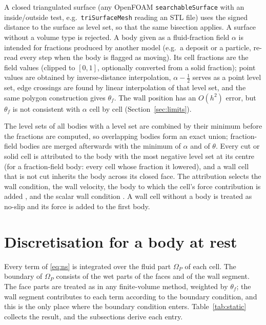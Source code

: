 \documentclass[11pt,a4paper]{article}
\theoremstyle{remark}
\newcommand{\code}[1]{\texttt{#1}}
\begin{document}
A closed triangulated surface (any OpenFOAM \code{searchableSurface} with an inside/outside
test, e.g.\ \code{triSurfaceMesh} reading an STL file) uses the signed distance to the surface
as level set, so that the same bisection applies. A surface without a volume type is
rejected.
A body given as a fluid-fraction field $\alpha$ is intended for fractions produced by
another model (e.g.\ a deposit or a particle, re-read every step when the body is flagged as
moving).
Its cell fractions are the field values (clipped to $[0,1]$, optionally converted from a
solid fraction); point values are obtained by inverse-distance interpolation, $\alpha-\tfrac12$
serves as a point level set, edge crossings are found by linear interpolation of that level
set, and the same polygon construction gives $\theta_f$. The wall position has an $O(h^2)$
error, but $\theta_f$ is not consistent with $\alpha$ cell by cell
(Section~\ref{sec:limits}).

The level sets of all bodies with a level set are combined by their minimum before the
fractions are computed, so overlapping bodies form an exact union; fraction-field bodies are
merged afterwards with the minimum of $\alpha$ and of $\theta$. Every cut or solid cell is
attributed to the body with the most negative level set at its centre (for a fraction-field
body: every cell whose fraction it lowered), and a wall cell that is not cut inherits the
body across its closed face. The attribution selects the wall condition, the wall
velocity, the
body to which the cell's force contribution is added%
, and the scalar wall condition%
. A wall cell without a body is treated as no-slip and its force is added to the first body.
\section{Discretisation for a body at rest}
\label{sec:static}

Every term of \eqref{eq:ns} is integrated over the fluid part $\Omega_P$ of each cell. The
boundary of $\Omega_P$ consists of the wet parts of the faces and of the wall segment. The
face parts are treated as in any finite-volume method, weighted by $\theta_f$; the wall
segment contributes to each term according to the boundary condition, and this is the only
place where the boundary condition enters. Table~\ref{tab:static} collects the result, and
the subsections derive each entry.
\end{document}
